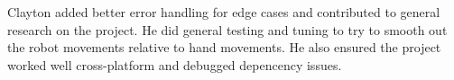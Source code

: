 \documentclass{article}
\begin{document}
Clayton added better error handling for edge cases and contributed to general
research on the project. He did general testing and tuning to try to smooth out
the robot movements relative to hand movements. He also ensured the
project worked well cross-platform and debugged depencency issues.

\clearpage


\raggedright
\end{document}
